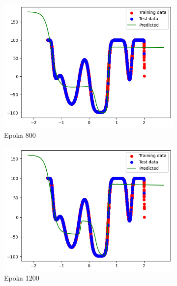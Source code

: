 \documentclass{article}
\begin{document}
\begin{figure}[H]
    \centering
    \begin{subfigure}{0.32\textwidth}
        \includegraphics[width=\linewidth]{img/ae3/mml4.png}
        \caption{Epoka 800}
    \end{subfigure}
    \hfill
    \begin{subfigure}{0.32\textwidth}
        \includegraphics[width=\linewidth]{img/ae3/mml5.png}
        \caption{Epoka 1200}
    \end{subfigure}
    \hfill
    \begin{subfigure}{0.32\textwidth}

\end{subfigure}
\end{figure}
\end{document}
